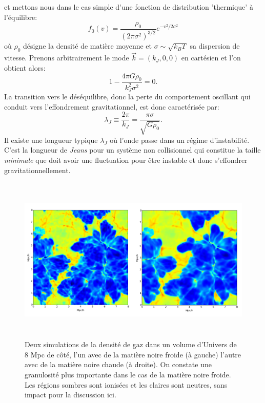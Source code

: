  et mettons nous dans le cas simple d'une fonction de distribution 'thermique' à l'équilibre:
\begin{equation}
f_0(v)=\frac{\rho_0}{(2\pi\sigma^2)^{3/2}}e^{-v^2/2\sigma^2}
\end{equation}
où $\rho_0$ désigne la densité de matière moyenne et $\sigma\sim \sqrt{k_B T}$ sa dispersion de vitesse. Prenons arbitrairement le mode $\vec{k}=(k_J,0,0)$ en cartésien et l'on obtient alors:
\begin{equation}
1-\frac{4\pi G \rho_0}{k_J^2\sigma^2}=0.
\end{equation}
La transition vers le déséquilibre, donc la perte du comportement oscillant qui conduit vers l'effondrement gravitationnel, est donc caractérisée par:
\begin{equation}
\lambda_J\equiv\frac{2\pi}{k_J}=\frac{\pi \sigma}{\sqrt{G\rho_0}}.
\end{equation} 
Il existe une longueur typique $\lambda_J$ où l'onde passe dans un régime d'instabilité. C'est la longueur de \textit{Jeans} pour un système non collisionnel qui constitue la taille \textit{minimale} que doit avoir une fluctuation pour être instable et donc s'effondrer gravitationnellement.

\begin{figure}[htbp]
	\centering
		\includegraphics[height=8cm]{figs/wdm.png}
	\caption[Deux simulations de la densité de gaz dans un volume d'Univers de 8 Mpc de côté]{Deux simulations de la densité de gaz dans un volume d'Univers de 8 Mpc de côté, l'un avec de la matière noire froide (à gauche) l'autre avec de la matière noire chaude (à droite). On constate une granulosité plus importante dans le cas de la matière noire froide. Les régions sombres sont ionisées et les claires sont neutres, sans impact pour la discussion ici.} 
	\label{f:wdm}
\end{figure}


